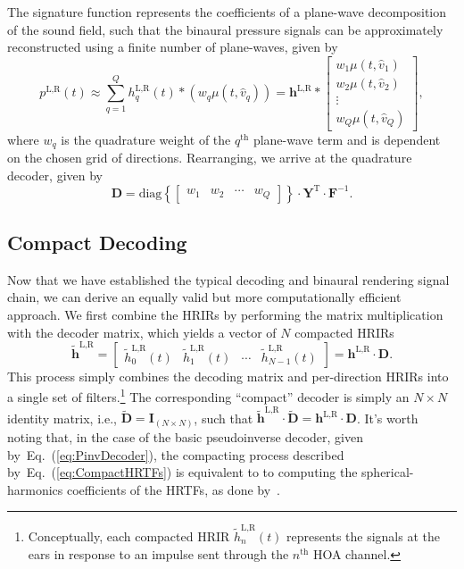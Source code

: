 \documentclass[11pt, oneside]{article}
\newcommand{\eqnref}[1]{Eq.~(\ref{#1})}
\begin{document}
The signature function represents the coefficients of a plane-wave decomposition of the sound field,
such that the binaural pressure signals can be approximately reconstructed using a finite number of plane-waves, given by~\citep{Duraiswami2005a}
\begin{equation}
p^{\text{L,R}}(t) \approx \sum_{q=1}^Q h_{q}^{\text{L,R}}(t) \ast \left( w_q \mu(t,\hat{v}_q) \right)
 = \mathbf{h}^{\text{L,R}} \ast
\begin{bmatrix}
w_1 \mu(t,\hat{v}_1) \\ w_2 \mu(t,\hat{v}_2) \\ \vdots \\ w_Q \mu(t,\hat{v}_Q)
\end{bmatrix},
\end{equation}
where $w_q$ is the quadrature weight of the $q^\textrm{th}$ plane-wave term and is dependent on the chosen grid of directions.
Rearranging, we arrive at the quadrature decoder, given by
\begin{equation}
\mathbf{D} = 
\text{diag} \left\{ \begin{bmatrix} w_1 & w_2 & \cdots & w_Q \end{bmatrix} \right\}
\cdot \mathbf{Y}^{\textrm{T}} \cdot \mathbf{F}^{-1}.
\end{equation}

\subsection{Compact Decoding}
Now that we have established the typical decoding and binaural rendering signal chain,
we can derive an equally valid but more computationally efficient approach.
We first combine the HRIRs by performing the matrix multiplication with the decoder matrix,
which yields a vector of $N$ compacted HRIRs
\begin{equation}\label{eq:CompactHRTFs}
\mathbf{\tilde{h}}^{\text{L,R}} = 
\begin{bmatrix}
\tilde{h}_{0}^{\text{L,R}}(t) & \tilde{h}_{1}^{\text{L,R}}(t) & \cdots & \tilde{h}_{N-1}^{\text{L,R}}(t)
\end{bmatrix}
 = \mathbf{h}^{\text{L,R}} \cdot \mathbf{D}.
\end{equation}
This process simply combines the decoding matrix and per-direction HRIRs into a single set of filters.\footnote{Conceptually,
each compacted HRIR $\tilde{h}_{n}^{\text{L,R}}(t)$ represents the signals at the ears in response to an impulse sent through the $n^{\textrm{th}}$ HOA channel.}
The corresponding ``compact'' decoder is simply an $N \times N$ identity matrix, i.e., $\mathbf{\tilde{D}} = \mathbf{I}_{(N \times N)}$, such that $\mathbf{\tilde{h}}^{\text{L,R}} \cdot \mathbf{\tilde{D}} = \mathbf{h}^{\text{L,R}} \cdot \mathbf{D}$.
It's worth noting that, in the case of the basic pseudoinverse decoder, given by~\eqnref{eq:PinvDecoder},
the compacting process described by~\eqnref{eq:CompactHRTFs} is equivalent to to computing the
spherical-harmonics coefficients of the HRTFs, as done by~\citet[Sec.~IV]{RafaelyAvni2010}.
\end{document}
